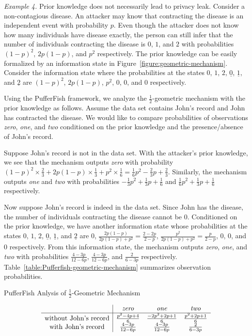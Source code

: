 \noindent
\textit{Example 4.}
Prior knowledge does not necessarily lead to privacy leak. Consider a
non-contagious disease. An attacker may know that contracting the
disease is an independent event with probability $p$. Even though the
attacker does not know how many individuals have disease exactly, the
person can still infer that the number of individuals contracting the
disease is $0$, $1$, and $2$ with probabilities $(1-p)^2$, $2p(1-p)$,
and $p^2$ respectively. The prior knowledge can be easily formalized
by an information state in Figure~\ref{figure:geometric-mechanism}.
Consider the information
state where the probabilities at the states $0$, $1$, $2$,
$\underline{0}$, $\underline{1}$, and $\underline{2}$ are $(1-p)^2$,
$2p(1-p)$, $p^2$, $0$, $0$, and $0$ respectively.

Using the PufferFish framework, we analyze the $\frac{1}{2}$-geometric
mechanism with the prior knowledge as follows. Assume the data set
contains John's record and John has contracted the disease. We would
like to compare probabilities of observations \textit{zero},
\textit{one}, and \textit{two} conditioned on the prior knowledge and
the presence/absence of John's record.

Suppose John's record is not in the data set. With the attacker's
prior knowledge, we see that the mechanism outputs \textit{zero} with
probability $(1-p)^2 \times \frac{2}{3} + 2p(1-p) \times \frac{1}{3} +
p^2 \times \frac{1}{6} = \frac{1}{6} p^2 - \frac{2}{3} p +
\frac{2}{3}$. Similarly, the mechanism outputs \textit{one} and
\textit{two} with probabilities $-\frac{1}{3} p^2 + \frac{1}{3} p +
\frac{1}{6}$ and $\frac{1}{6} p^2 + \frac{1}{3} p + \frac{1}{6}$
respectively.

Now suppose John's record is indeed in the data set. Since John has
the disease, the number of individuals contracting the disease cannot
be $0$. Conditioned on the prior knowledge, we have another
information state whose probabilities at the states $0$, $1$, $2$,
$\underline{0}$, $\underline{1}$, and $\underline{2}$ are $0$,
$\frac{2p(1-p)}{2p(1-p) + p^2} = \frac{2-2p}{2-p}$,
$\frac{p^2}{2p(1-p) + p^2} = \frac{p}{2-p}$, $0$, $0$, and $0$
respectively. From this information state, the mechanism outputs
\textit{zero}, \textit{one}, and \textit{two} with probabilities
$\frac{4-3p}{12-6p}$, $\frac{4-3p}{12-6p}$, and $\frac{2}{6-3p}$
respectively. Table~\ref{table:Pufferfish-geometric-mechanism}
summarizes observation probabilities.

\begin{table}
  \caption{PufferFish Anlysis of $\frac{1}{2}$-Geometric Mechanism}
  \label{table:Pufferfish-geometric-mechanism}
  \centering
  \[
    \begin{array}{c|ccc}
      & \textit{zero} & \textit{one} & \textit{two} \\
      \hline
      \textmd{without John's record}
      & \frac{p^2 - 4p + 4}{6}
      & \frac{-2p^2 + 2p + 1}{6}
      & \frac{p^2 + 2p + 1}{6}
      \\

      \textmd{with John's record}
      & \frac{4-3p}{12-6p}
      & \frac{4-3p}{12-6p}
      & \frac{2}{6-3p}
    \end{array}
  \]
\end{table}

